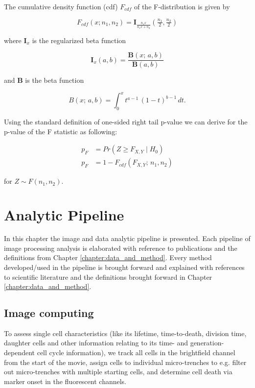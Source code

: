 \documentclass[pdftex,12pt,a4paper]{report}
\begin{document}
The cumulative density function (cdf) $F_{cdf}$ of the F-distribution is given by

\begin{equation}
F_{cdf}(x; n_1, n_2)= \mathbf{I}_{\frac{n_1 x}{n_1 x + n_2}}\left (\tfrac{n_1}{2}, \tfrac{n_2}{2} \right)
\end{equation}

where $\mathbf{I}_x$ is the regularized beta function

\begin{equation}
\mathbf{I}_x(a,b) = \frac{\mathbf{B}(x;\,a,b)}{\mathbf{B}(a,b)}
\end{equation}

and $\mathbf{B}$ is the beta function

\begin{equation}
B(x;\,a,b) = \int_0^x t^{a-1}\,(1-t)^{b-1}\,dt.
\end{equation}

Using the  standard definition of one-sided right tail p-value we can derive for the p-value of the F statistic as following:

\begin{align}
  p_F &= Pr(Z \geq F_{X,Y} \mid H_0) \nonumber \\
  p_F &= 1 - F_{cdf}(F_{X,Y}; \, n_1, n_2)\label{eq:ftest_dof_y}
\end{align}

for $Z \sim F(n_1, n_2)$.

\chapter{Analytic Pipeline}


In this chapter the image and data analytic pipeline is presented. Each pipeline of image processing analysis is elaborated with reference to publications and the definitions from Chapter \ref{chapter:data_and_method}.
Every method developed/used in the pipeline is brought forward and explained with references to scientific literature and the definitions brought forward in Chapter \ref{chapter:data_and_method}.

\section{Image computing}

To assess single cell characteristics (like its lifetime, time-to-death, division time, daughter cells and other information relating to its time- and generation-dependent cell cycle information), we track all cells in the brightfield channel from the start of the movie, assign cells to individual micro-trenches to e.g. filter out micro-trenches with multiple starting cells, and determine cell death via marker onset in the fluorescent channels.
\end{document}
